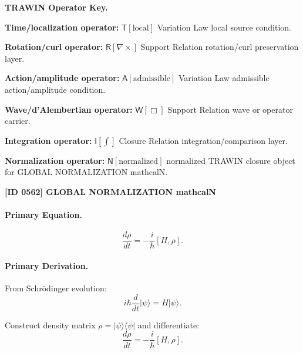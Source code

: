 \par\vspace{0.45\baselineskip}
\noindent\begin{minipage}[t]{\linewidth}
\begingroup
\small
\raggedright
\textbf{TRAWIN Operator Key.}\par
\noindent\textbf{Time/localization operator:} $\mathsf{T}\!\left[\mathrm{local}\right]$ Variation Law local source condition.\par
\noindent\textbf{Rotation/curl operator:} $\mathsf{R}\!\left[\nabla\times\right]$ Support Relation rotation/curl preservation layer.\par
\noindent\textbf{Action/amplitude operator:} $\mathsf{A}\!\left[\mathrm{admissible}\right]$ Variation Law admissible action/amplitude condition.\par
\noindent\textbf{Wave/d'Alembertian operator:} $\mathsf{W}\!\left[\Box\right]$ Support Relation wave or operator carrier.\par
\noindent\textbf{Integration operator:} $\mathsf{I}\!\left[\int\right]$ Closure Relation integration/comparison layer.\par
\noindent\textbf{Normalization operator:} $\mathsf{N}\!\left[\mathrm{normalized}\right]$ normalized TRAWIN closure object for GLOBAL NORMALIZATION mathcalN.\par
\endgroup
\end{minipage}

\clearpage
\noindent\textbf{[ID 0562] GLOBAL NORMALIZATION mathcalN}\par
\vspace{0.35em}
\paragraph{Primary Equation.}
\begin{equation}
\frac{d\rho}{dt} = -\frac{i}{\hbar}[H,\rho].
\end{equation}

\paragraph{Primary Derivation.}
From Schrödinger evolution:
\begin{equation}
i\hbar \frac{d}{dt}|\psi\rangle = H|\psi\rangle.
\end{equation}

Construct density matrix $\rho = |\psi\rangle\langle \psi|$ and differentiate:
\begin{equation}
\frac{d\rho}{dt} = -\frac{i}{\hbar}[H,\rho].
\end{equation}


